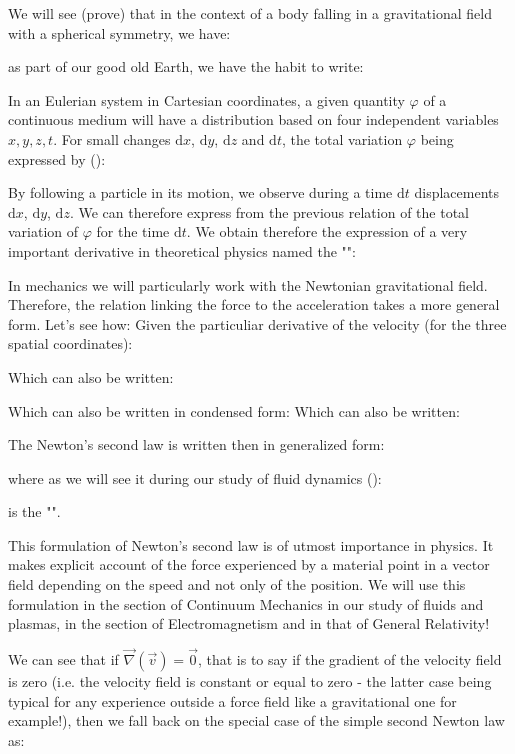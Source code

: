 	We will see (prove) that in the context of a body falling in a gravitational field with a spherical symmetry, we have:
	
	as part of our good old Earth, we have the habit to write:
	
	In an Eulerian system in Cartesian coordinates, a given quantity $\varphi$ of a continuous medium will have a distribution based on four independent variables $x, y, z, t$. For small changes $\mathrm{d}x$, $\mathrm{d}y$, $\mathrm{d}z$ and $\mathrm{d}t$, the total variation $\varphi$ being expressed by ():
	
	By following a particle in its motion, we observe during a time $\mathrm{d}t$ displacements $\mathrm{d}x$, $\mathrm{d}y$, $\mathrm{d}z$. We can therefore express from the previous relation of the total variation of $\varphi$ for the time $\mathrm{d}t$. We obtain therefore the expression of a very important derivative in theoretical physics named the "":
	
	In mechanics we will particularly work with the Newtonian gravitational field. Therefore, the relation linking the force to the acceleration takes a more general form. Let's see how:
	Given the particuliar derivative of the velocity (for the three spatial coordinates):
	
	Which can also be written:
	
	Which can also be written in condensed form:
	Which can also be written:
	
	The Newton's second law is written then in generalized form:
	
	where as we will see it during our study of fluid dynamics ():
	
	is the "".
	
	This formulation of Newton's second law is of utmost importance in physics. It makes explicit account of the force experienced by a material point in a vector field depending on the speed and not only of the position. We will use this formulation in the section of Continuum Mechanics in our study of fluids and plasmas, in the section of Electromagnetism and in that of General Relativity!
	
	We can see that if $\vec{\nabla}(\vec{v})=\vec{0}$, that is to say if the gradient of the velocity field is zero (i.e. the velocity field is constant or equal to zero - the latter case being typical for any experience outside a force field like a gravitational one for example!), then we fall back on the special case of the simple second Newton law as:
	
